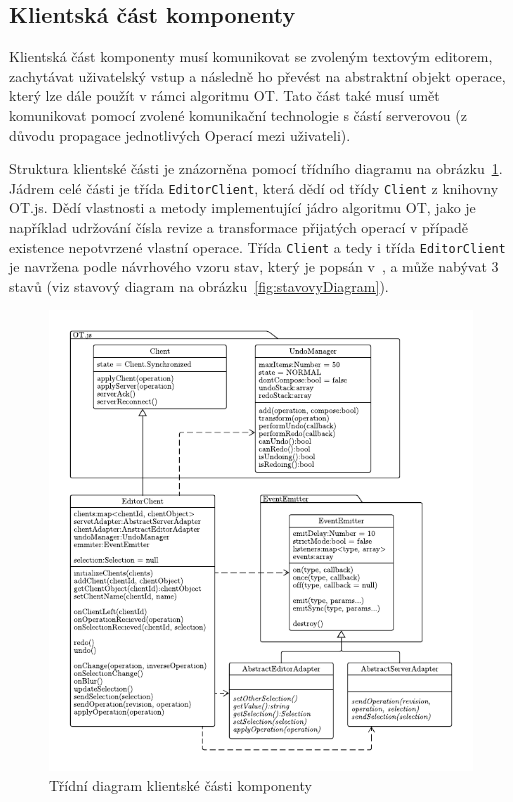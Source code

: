 

\subsection{Klientská část komponenty}\label{subsec:klientskáČást}

Klientská část komponenty musí komunikovat se zvoleným textovým editorem, zachytávat uživatelský vstup a následně ho převést na abstraktní objekt operace, který lze dále použít v rámci algoritmu \gls{OT}.
Tato část také musí umět komunikovat pomocí zvolené komunikační technologie s částí serverovou (z důvodu propagace jednotlivých Operací mezi uživateli).

Struktura klientské části je znázorněna pomocí třídního diagramu na obrázku~\ref{fig:EditorClient}.
Jádrem celé části je třída \texttt{EditorClient}, která dědí od třídy \texttt{Client} z knihovny OT.js.
Dědí vlastnosti a metody implementující jádro algoritmu \gls{OT}, jako je například udržování čísla revize a transformace přijatých operací v případě existence nepotvrzené vlastní operace.
Třída \texttt{Client} a tedy i třída \texttt{EditorClient} je navržena podle návrhového vzoru stav, který je popsán v~\cite[str.~283]{gof:patterns}, a může nabývat 3 stavů (viz stavový diagram na obrázku~\ref{fig:stavovyDiagram}).

\begin{figure}[ht!]
    \centering
    \includegraphics[width=\textwidth]{partials/navrh/editor/EditorClient.pdf}
    \caption{Třídní diagram klientské části komponenty}\label{fig:EditorClient}
\end{figure}

